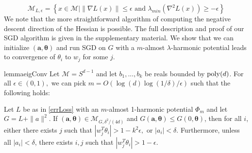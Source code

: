 %
\[\mathcal{M}_{L, \epsilon} = \left\{x\in \mathcal{M} \Big| \|\nabla L(x)\|
  \leq \epsilon \text{ and } \lambda_{min}(\nabla^2 L(x)) \geq
  -\epsilon\right\}\]
%
We note that the more straightforward algorithm of computing the negative descent direction of the Hessian is possible. The full description and proof of our SGD algorithm is given in the supplementary material. We show that we can initialize $(\boldsymbol{a,\theta})$ and run SGD on $G$ with a $m$-almost $\lambda$-harmonic potential leads to convergence of $\theta_i$ to $w_j$ for some $j$.
%
%
\begin{restatable}{lemma}{eigConv}
\label{eigConv}
Let $\mathcal{M} = S^{d-1}$ and let $b_1,...,b_k$ be reals bounded by
$\mathrm{poly}(d)$. For all $\epsilon \in (0,1),$ we can pick
$m = O(\log(d)\log(1/\delta)/\epsilon)$ such that the following holds:

Let $L$ be as in \eqref{errLoss} with an $m$-almost 1-harmonic
potential $\Phi_m$ and let $G = L + \|a\|^2$.  If
$(\boldsymbol{a,\theta}) \in \mathcal{M}_{G, \delta^2 / (4d)}$ and
$G(\boldsymbol{a,\theta}) \leq G(0,\boldsymbol{\theta})$, then for all
$i$, either there exists $j$ such that
$|w_j^T\theta_i| > 1- k^2\epsilon,$ or $|a_i| < \delta$. Furthermore, unless all $|a_i| <\delta$,  there exists $i, j$ such that $|w_j^T\theta_i| > 1-\epsilon$.
\end{restatable}
%
